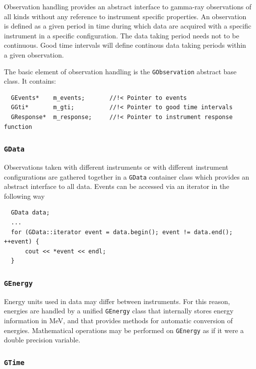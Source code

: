 \documentclass{article}[12pt,a4]
\begin{document}
Observation handling provides an abstract interface to gamma-ray observations of all kinds
without any reference to instrument specific properties.
An observation is defined as a given period in time during which data are acquired with a
specific instrument in a specific configuration.
The data taking period needs not to be continuous.
Good time intervals will define continous data taking periods within a given observation.

The basic element of observation handling is the {\tt GObservation} abstract base class.
It contains:
\begin{verbatim}
  GEvents*    m_events;       //!< Pointer to events
  GGti*       m_gti;          //!< Pointer to good time intervals
  GResponse*  m_response;     //!< Pointer to instrument response function
\end{verbatim}


\subsubsection{{\tt GData}}

Observations taken with different instruments or with different instrument configurations are
gathered together in a {\tt GData} container class which provides an abstract interface to all 
data.
Events can be accessed via an iterator in the following way
\begin{verbatim}
  GData data;
  ...
  for (GData::iterator event = data.begin(); event != data.end(); ++event) {
      cout << *event << endl;
  }
\end{verbatim}


\subsubsection{{\tt GEnergy}}

Energy units used in data may differ between instruments.
For this reason, energies are handled by a unified {\tt GEnergy} class that internally
stores energy information in MeV, and that provides methods for automatic conversion
of energies.
Mathematical operations may be performed on {\tt GEnergy} as if it were a double
precision variable.


\subsubsection{{\tt GTime}}
\end{document}
